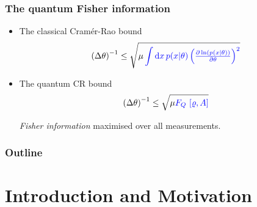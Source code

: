 \documentclass{beamer}
\newcommand{\standard}[1]{\ensuremath{\left(\Delta #1 \right)}}
\def\d{{\rm d}}
\def\lpar{\left(}
\def\rpar{\right)}
\begin{document}
\begin{frame}
	\frametitle{The quantum Fisher information}

	\begin{itemize}
		\item<1-> The classical Cram\'er-Rao bound
			\[
				\standard{\theta}^{-1} \le {\sqrt{\mu \color{blue}
				\int \d x \, p(x|\theta)
				\lpar \tfrac{\partial \ln(p(x|\theta))}{\partial \theta} \rpar^2}}
			\]
		\item<2-> The quantum CR bound
			\[
				\standard{\theta}^{-1} \le {\sqrt{\mu \color{blue}F_Q [\varrho,A]}}
			\]

		\emph{\color{blue}Fisher information} maximised over all measurements.

	\end{itemize}
\end{frame}

\begin{frame}
	\frametitle{Outline}
	\tableofcontents
\end{frame}

\section{Introduction and Motivation}
\end{document}
